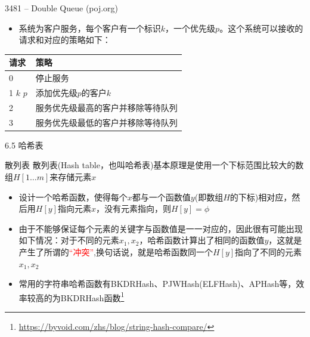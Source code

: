 \begin{frame}{3481 -- Double Queue (poj.org)}
    \begin{itemize}
        \item  系统为客户服务，每个客户有一个标识$k$，一个优先级$p$。这个系统可以接收的请求和对应的策略如下：
    \end{itemize}
    \begin{table}
        \begin{tabular}{l|l}
            请求      & 策略                               \\\hline
			 0         & 停止服务                          \\\hline
			 1 $k$ $p$ & 添加优先级$p$的客户$k$             \\\hline
			 2         & 服务优先级最高的客户并移除等待队列 \\\hline
			 3         & 服务优先级最低的客户并移除等待队列 \\\hline
        \end{tabular}
    \end{table}
\end{frame}
\begin{frame}{6.5 哈希表}
    \begin{block}{散列表}
        散列表(Hash table，也叫哈希表)基本原理是使用一个下标范围比较大的数组$H[1\ldots m]$来存储元素$x$
    \end{block}    
    \begin{itemize}
        \item 设计一个哈希函数，使得每个$x$都与一个函数值$y$(即数组$H$的下标)相对应，然后用$H[y]$指向元素$x$，没有元素指向，则$H[y]=\phi$
        \item 由于不能够保证每个元素的关键字与函数值是一一对应的，因此很有可能出现如下情况：对于不同的元素$x_1,x_2$，哈希函数计算出了相同的函数值$y$，这就是产生了所谓的\textcolor{red}{“冲突”},换句话说，就是哈希函数同一个$H[y]$指向了不同的元素$x_1,x_2$
        \item 常用的字符串哈希函数有BKDRHash、PJWHash(ELFHash)、APHash等，效率较高的为BKDRHash函数\footnote{\url{https://byvoid.com/zhs/blog/string-hash-compare/}}
    \end{itemize}
\end{frame}
